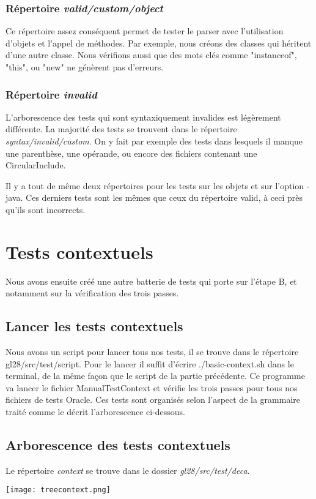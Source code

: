 \documentclass[12pt, a4paper, one side]{article}
\begin{document}
\subsubsection{Répertoire \textit{valid/custom/object}}
Ce répertoire assez conséquent permet de tester le parser avec l'utilisation d'objets et l'appel de méthodes. Par exemple, nous créons des classes qui héritent d'une autre classe. Nous vérifions aussi que des mots clés comme "instanceof", "this", ou "new" ne génèrent pas d'erreurs.

\subsubsection{Répertoire \textit{invalid}}
L'arborescence des tests qui sont syntaxiquement invalides est légèrement différente. La majorité des tests se trouvent dans le répertoire \textit{syntax/invalid/custom}. On y fait par exemple des tests dans lesquels il manque une parenthèse, une opérande, ou encore des fichiers contenant une CircularInclude.

Il y a tout de même deux répertoires pour les tests sur les objets et sur l'option -java. Ces derniers tests sont les mêmes que ceux du répertoire valid, à ceci près qu'ils sont incorrects.


\section{Tests contextuels}
Nous avons ensuite créé une autre batterie de tests qui porte sur l'étape B, et notamment sur la vérification des trois passes.

\subsection{Lancer les tests contextuels}
Nous avons un script pour lancer tous nos tests, il se trouve dans le répertoire gl28/src/test/script. Pour le lancer il suffit d'écrire ./basic-context.sh dans le terminal, de la même façon que le script de la partie précédente. Ce programme va lancer le fichier ManualTestContext et vérifie les trois passes pour tous nos fichiers de tests Oracle. Ces tests sont organisés selon l'aspect de la grammaire traité comme le décrit l'arborescence ci-dessous.

\subsection{Arborescence des tests contextuels}
Le répertoire \textit{context} se trouve dans le dossier \textit{gl28/src/test/deca}.
\begin{center}
    \texttt{[image: treecontext.png]}
\end{center}
\end{document}
